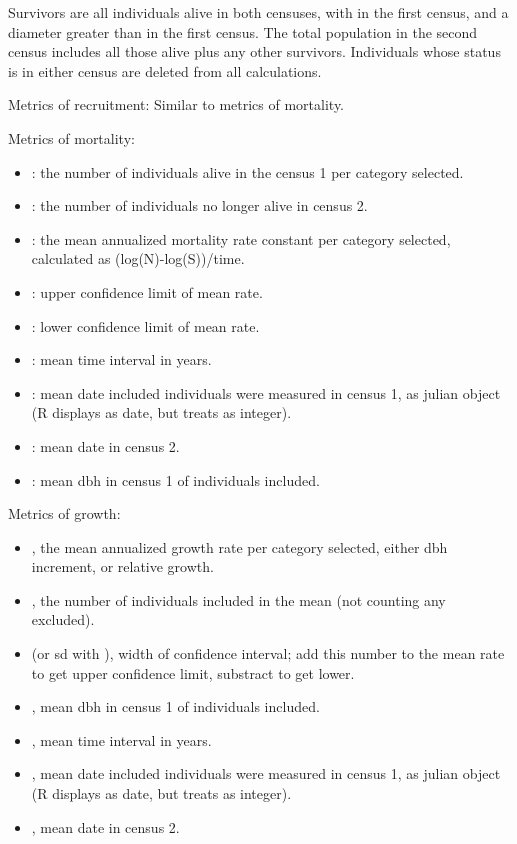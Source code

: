 \documentclass[a4paper]{book}
\begin{document}
%
\begin{Details}\relax
Survivors are all individuals alive in both censuses, with  in
the first census, and a diameter greater than  in the first census.
The total population in the second census includes all those alive plus any
other survivors. Individuals whose status is  in either census are
deleted from all calculations.
\end{Details}
%
\begin{Value}
Metrics of recruitment: Similar to metrics of mortality.

Metrics of mortality:
\begin{itemize}

\item {}: the number of individuals alive in the census 1 per category
selected.
\item {}: the number of individuals no longer alive in census 2.
\item {}: the mean annualized mortality rate constant per category
selected, calculated as (log(N)-log(S))/time.
\item {}: upper confidence limit of mean rate.
\item {}: lower confidence limit of mean rate.
\item {}: mean time interval in years.
\item {}: mean date included individuals were measured in census 1, as
julian object (R displays as date, but treats as integer).
\item {}: mean date in census 2.
\item {}: mean dbh in census 1 of individuals included.

\end{itemize}


Metrics of growth:
\begin{itemize}

\item {}, the mean annualized growth rate per category selected, either dbh
increment, or relative growth.
\item {}, the number of individuals included in the mean (not counting any
excluded).
\item {} (or sd with ), width of confidence interval; add this
number to the mean rate to get upper confidence limit, substract to get
lower.
\item {}, mean dbh in census 1 of individuals included.
\item {}, mean time interval in years.
\item {}, mean date included individuals were measured in census 1, as
julian object (R displays as date, but treats as integer).
\item {}, mean date in census 2.

\end{itemize}

\end{Value}
\end{document}
